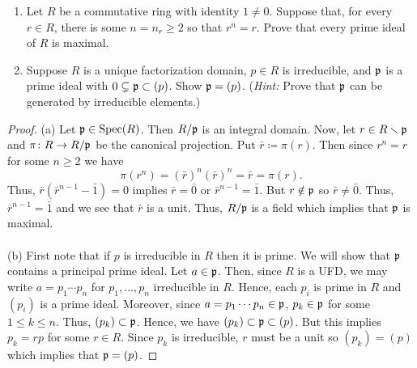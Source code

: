 \begin{problem}
\begin{enumerate}[label=(\alph*)]
\item Let $R$ be a commutative ring with identity $1\neq 0$. Suppose that,
  for every $r\in R$, there is some $n=n_r\geq 2$ so that $r^n=r$. Prove
  that every prime ideal of $R$ is maximal.
\item Suppose $R$ is a unique factorization domain, $p\in R$ is
  irreducible, and $\mathfrak{p}$ is a prime ideal with
  $0\subsetneq\mathfrak{p}\subset(p)$. Show $\mathfrak{p}=(p)$. (\emph{Hint:} Prove
  that $\mathfrak{p}$ can be generated by irreducible elements.)
\end{enumerate}
\end{problem}
\begin{proof}
(a) Let $\mathfrak{p}\in\operatorname{Spec}(R)$. Then $R/\mathfrak{p}$ is an integral domain. Now,
let $r\in R\minus\frakp$ and $\pi\colon R\to R/\mathfrak{p}$ be the canonical
projection. Put $\bar r\coloneqq\pi(r)$. Then since $r^n=r$ for some $n\geq
2$ we have
\[
\pi(r^n)=(\bar r)^n(\bar r)^n=\bar r=\pi(r).
\]
Thus, $\bar r(\bar r^{n-1}-\bar 1)=0$ implies $\bar r=\bar 0$ or $\bar
r^{n-1}=\bar 1$. But $r\notin\mathfrak{p}$ so $\bar r\neq\bar 0$. Thus, $\bar
r^{n-1}=\bar 1$ and we see that $\bar r$ is a unit. Thus, $R/\mathfrak{p}$ is a
field which implies that $\mathfrak{p}$ is maximal.
\\\\
(b) First note that if $p$ is irreducible in $R$ then it is prime. We will
show that $\mathfrak{p}$ contains a principal prime ideal. Let
$a\in\mathfrak{p}$. Then, since $R$ is a UFD, we may write $a=p_1\cdots p_n$ for
$p_1,...,p_n$ irreducible in $R$. Hence, each $p_i$ is prime in $R$ and
$(p_i)$ is a prime ideal. Moreover, since $a=p_1\cdots p_n\in\mathfrak{p}$,
$p_k\in\mathfrak{p}$ for some $1\leq k\leq n$. Thus, $(p_k)\subset\mathfrak{p}$. Hence,
we have $(p_k)\subset\mathfrak{p}\subset(p)$. But this implies $p_k=rp$ for some
$r\in R$. Since $p_k$ is irreducible, $r$ must be a unit so $(p_k)=(p)$
which implies that $\mathfrak{p}=(p)$.
\end{proof}


